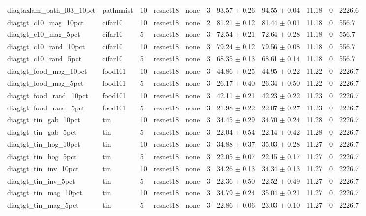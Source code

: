 \begin{tabular}{lllllllllll}
diagtaxlam_path_l03_10pct & pathmnist & 10 & resnet18 & none & 3 & 93.57 $\pm$ 0.26 & 94.55 $\pm$ 0.04 & 11.18 & 0 & 2226.6 \\
diagtgt_c10_mag_10pct & cifar10 & 10 & resnet18 & none & 2 & 81.21 $\pm$ 0.12 & 81.44 $\pm$ 0.01 & 11.18 & 0 & 556.7 \\
diagtgt_c10_mag_5pct & cifar10 & 5 & resnet18 & none & 3 & 72.54 $\pm$ 0.21 & 72.64 $\pm$ 0.28 & 11.18 & 0 & 556.7 \\
diagtgt_c10_rand_10pct & cifar10 & 10 & resnet18 & none & 3 & 79.24 $\pm$ 0.12 & 79.56 $\pm$ 0.08 & 11.18 & 0 & 556.7 \\
diagtgt_c10_rand_5pct & cifar10 & 5 & resnet18 & none & 3 & 68.35 $\pm$ 0.13 & 68.61 $\pm$ 0.14 & 11.18 & 0 & 556.7 \\
diagtgt_food_mag_10pct & food101 & 10 & resnet18 & none & 3 & 44.86 $\pm$ 0.25 & 44.95 $\pm$ 0.22 & 11.22 & 0 & 2226.7 \\
diagtgt_food_mag_5pct & food101 & 5 & resnet18 & none & 3 & 26.17 $\pm$ 0.40 & 26.34 $\pm$ 0.50 & 11.22 & 0 & 2226.7 \\
diagtgt_food_rand_10pct & food101 & 10 & resnet18 & none & 3 & 42.11 $\pm$ 0.21 & 42.23 $\pm$ 0.22 & 11.23 & 0 & 2226.7 \\
diagtgt_food_rand_5pct & food101 & 5 & resnet18 & none & 3 & 21.98 $\pm$ 0.22 & 22.07 $\pm$ 0.27 & 11.23 & 0 & 2226.7 \\
diagtgt_tin_gab_10pct & tin & 10 & resnet18 & none & 3 & 34.45 $\pm$ 0.29 & 34.70 $\pm$ 0.24 & 11.28 & 0 & 2226.7 \\
diagtgt_tin_gab_5pct & tin & 5 & resnet18 & none & 3 & 22.04 $\pm$ 0.54 & 22.14 $\pm$ 0.42 & 11.28 & 0 & 2226.7 \\
diagtgt_tin_hog_10pct & tin & 10 & resnet18 & none & 3 & 34.88 $\pm$ 0.37 & 35.03 $\pm$ 0.28 & 11.27 & 0 & 2226.7 \\
diagtgt_tin_hog_5pct & tin & 5 & resnet18 & none & 3 & 22.05 $\pm$ 0.07 & 22.15 $\pm$ 0.17 & 11.27 & 0 & 2226.7 \\
diagtgt_tin_inv_10pct & tin & 10 & resnet18 & none & 3 & 34.26 $\pm$ 0.13 & 34.34 $\pm$ 0.13 & 11.27 & 0 & 2226.7 \\
diagtgt_tin_inv_5pct & tin & 5 & resnet18 & none & 3 & 22.36 $\pm$ 0.50 & 22.52 $\pm$ 0.49 & 11.27 & 0 & 2226.7 \\
diagtgt_tin_mag_10pct & tin & 10 & resnet18 & none & 3 & 34.79 $\pm$ 0.24 & 35.04 $\pm$ 0.21 & 11.27 & 0 & 2226.7 \\
diagtgt_tin_mag_5pct & tin & 5 & resnet18 & none & 3 & 22.86 $\pm$ 0.06 & 23.03 $\pm$ 0.10 & 11.27 & 0 & 2226.7 \\

\end{tabular}
